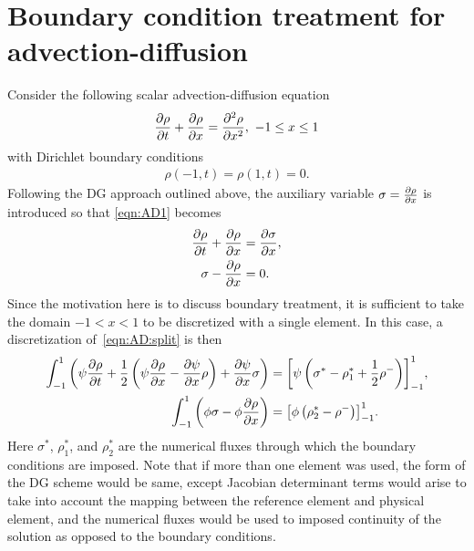 \documentclass{report}
\begin{document}
\section{Boundary condition treatment for advection-diffusion}
Consider the following scalar advection-diffusion equation
\begin{align}
  \label{eqn:AD}
  \frac{\partial \rho}{\partial t} + \frac{\partial \rho}{\partial x} = \frac{\partial ^2\rho}{\partial x^2},~ -1 \le x \le 1
\end{align}
with Dirichlet boundary conditions
\begin{align}
  \rho(-1, t) = \rho(1, t) = 0.
\end{align}
Following the DG approach outlined above, the auxiliary variable
$\sigma = \frac{\partial \rho}{\partial x}$ is introduced so that \eqref{eqn:AD1} becomes
\begin{align}
  \label{eqn:AD:split}
  \frac{\partial \rho}{\partial t} + \frac{\partial \rho}{\partial x} &= \frac{\partial \sigma}{\partial x},\\
  \sigma - \frac{\partial \rho}{\partial x} &= 0.
\end{align}
Since the motivation here is to discuss boundary treatment, it is sufficient to
take the domain $-1 < x < 1$ to be discretized with a single element. In this
case, a discretization of~\eqref{eqn:AD:split} is then
\begin{align}
  \label{eqn:AD:1}
  \int_{-1}^{1} \left(\psi \frac{\partial \rho}{\partial t}
  + \frac{1}{2}\left(\psi \frac{\partial \rho}{\partial x} - \frac{\partial \psi}{\partial x} \rho\right)
  + \frac{\partial \psi}{\partial x} \sigma\right) &= {\left[\psi\left(\sigma^{*} - \rho_{1}^{*} +
  \frac{1}{2} \rho^{-}\right)\right]}_{-1}^{1},\\
  \label{eqn:AD:2}
  \int_{-1}^{1} \left(\phi \sigma - \phi\frac{\partial \rho}{\partial x}\right)
  &= {\left[\phi\left(\rho_{2}^{*} - \rho^{-}\right) \right]}_{-1}^{1}.
\end{align}
Here $\sigma^{*}$, $\rho_{1}^{*}$, and $\rho_{2}^{*}$ are the numerical fluxes through
which the boundary conditions are imposed. Note that if more than one element
was used, the form of the DG scheme would be same, except Jacobian determinant
terms would arise to take into account the mapping between the reference element
and physical element, and the numerical fluxes would be used to imposed
continuity of the solution as opposed to the boundary conditions.
\end{document}
